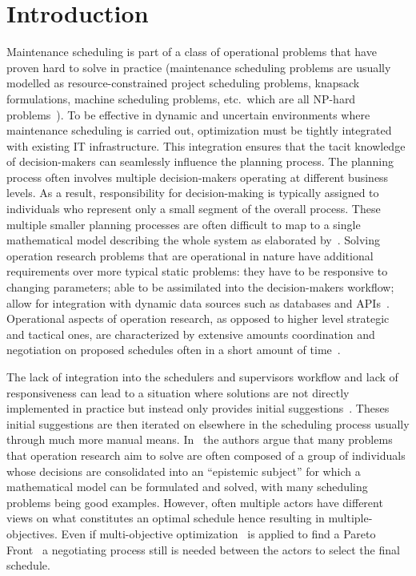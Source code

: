 \section{Introduction}
Maintenance scheduling is part of a class of operational problems that
have proven hard to solve in practice (maintenance scheduling problems are usually modelled as
resource-constrained project scheduling problems, knapsack formulations,
machine scheduling problems, etc.\ which are all NP-hard problems~\citep{garey1979computers}).
To be effective in dynamic and uncertain environments where maintenance
scheduling is carried out, optimization must be tightly integrated with
existing IT infrastructure. This integration ensures that the tacit knowledge of
decision-makers can seamlessly influence the planning process.
The planning process often involves multiple decision-makers operating at
different business levels. As a result, responsibility for decision-making is
typically assigned to individuals who represent only a small segment of the
overall process.
These multiple smaller planning processes are often difficult to map to
a single mathematical model describing the whole system as elaborated
by~\citep{barthelemy2002human}. Solving operation research problems that
are operational in nature have additional requirements over more typical
static problems: they have to be responsive to changing parameters; able to
be assimilated into the decision-makers workflow; allow for integration with
dynamic data sources such as databases and APIs~\citep{meignan_review_2015}.
Operational aspects of operation research, as opposed to higher level
strategic and tactical ones, are characterized by extensive amounts
coordination and negotiation on proposed schedules often in a short amount of
time~\citep{palmerMaintenancePlanningScheduling2019}.

The lack of integration into the schedulers and supervisors workflow
and lack of responsiveness can lead to a situation where solutions are
not directly implemented in practice but instead only provides initial
suggestions~\citep{meignan_review_2015}. Theses initial suggestions are then
iterated on elsewhere in the scheduling process usually through much more manual
means. In~\citep{barthelemy2002human} the authors argue that many problems that
operation research aim to solve are often composed of a group of individuals
whose decisions are consolidated into an ``epistemic subject'' for which a
mathematical model can be formulated and solved, with many scheduling problems
being good examples. However, often multiple actors have different views on what
constitutes an optimal schedule hence resulting in multiple-objectives. Even if
multi-objective optimization~\citep{ehrgott2002multiple} is applied to find a
Pareto Front~\citep{Pareto1897} a negotiating process still is needed between
the actors to select the final schedule.

